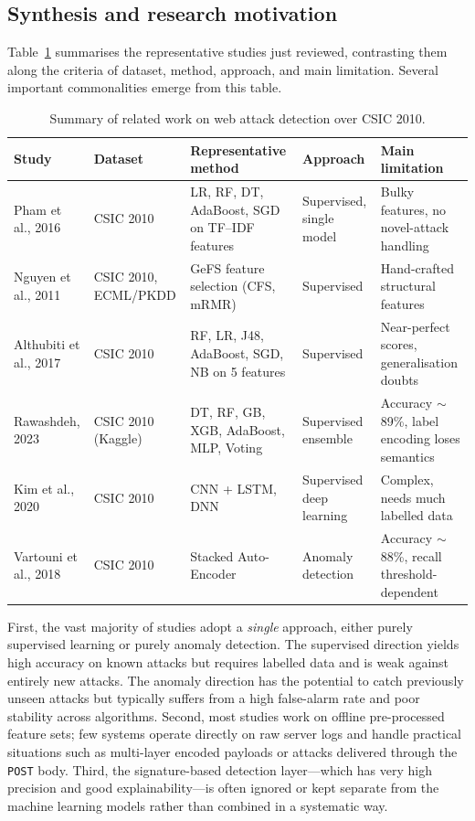 \subsection{Synthesis and research motivation}

Table~\ref{tab:related} summarises the representative studies just
reviewed, contrasting them along the criteria of dataset, method, approach,
and main limitation. Several important commonalities emerge from this
table.

\begin{table}[ht]
  \centering
  \caption{Summary of related work on web attack detection over CSIC 2010.}
  \label{tab:related}
  \renewcommand{\arraystretch}{1.45}
  \setlength{\tabcolsep}{8pt}
  \footnotesize
  \begin{tabular}{|p{2.3cm}|p{1.9cm}|p{3.0cm}|p{1.9cm}|p{2.8cm}|}
    \hline
    \textbf{Study} & \textbf{Dataset} & \textbf{Representative method} &
    \textbf{Approach} & \textbf{Main limitation} \\
    \hline
    Pham et al., 2016 & CSIC 2010 &
    LR, RF, DT, AdaBoost, SGD on TF--IDF features &
    Supervised, single model &
    Bulky features, no novel-attack handling \\
    \hline
    Nguyen et al., 2011 & CSIC 2010, ECML/PKDD &
    GeFS feature selection (CFS, mRMR) & Supervised &
    Hand-crafted structural features \\
    \hline
    Althubiti et al., 2017 & CSIC 2010 &
    RF, LR, J48, AdaBoost, SGD, NB on 5 features &
    Supervised & Near-perfect scores, generalisation doubts \\
    \hline
    Rawashdeh, 2023 & CSIC 2010 (Kaggle) &
    DT, RF, GB, XGB, AdaBoost, MLP, Voting & Supervised ensemble &
    Accuracy $\sim$89\%, label encoding loses semantics \\
    \hline
    Kim et al., 2020 & CSIC 2010 & CNN + LSTM, DNN &
    Supervised deep learning & Complex, needs much labelled data \\
    \hline
    Vartouni et al., 2018 & CSIC 2010 &
    Stacked Auto-Encoder & Anomaly detection &
    Accuracy $\sim$88\%, recall threshold-dependent \\
    \hline
  \end{tabular}
\end{table}

First, the vast majority of studies adopt a \emph{single} approach,
either purely supervised learning or purely anomaly detection. The
supervised direction yields high accuracy on known attacks but requires
labelled data and is weak against entirely new attacks. The anomaly
direction has the potential to catch previously unseen attacks but
typically suffers from a high false-alarm rate and poor stability across
algorithms. Second, most studies work on offline pre-processed feature
sets; few systems operate directly on raw server logs and handle practical
situations such as multi-layer encoded payloads or attacks delivered
through the \texttt{POST} body. Third, the signature-based detection
layer---which has very high precision and good explainability---is often
ignored or kept separate from the machine learning models rather than
combined in a systematic way.

